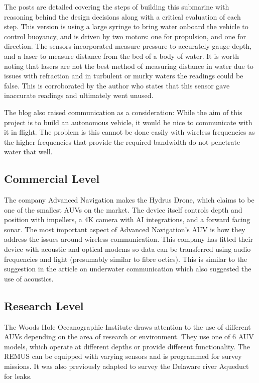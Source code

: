 \documentclass[11pt,a4paper,titlepage]{report}
\begin{document}
	The posts are detailed covering the steps of building this submarine with reasoning behind the design decisions along with a critical evaluation of each step. This version is using a large syringe to bring water onboard the vehicle to control buoyancy, and is driven by two motors: one for propulsion, and one for direction. The sensors incorporated measure pressure to accurately gauge depth, and a laser to measure distance from the bed of a body of water. It is worth noting that lasers are not the best method of measuring distance in water due to issues with refraction and in turbulent or murky waters the readings could be false. This is corroborated by the author who states that this sensor gave inaccurate readings and ultimately went unused. 
	
	The blog also raised communication as a consideration: While the aim of this project is to build an autonomous vehicle, it would be nice to communicate with it in flight. The problem is this cannot be done easily with wireless frequencies as the higher frequencies that provide the required bandwidth do not penetrate water that well.
	
	\subsection*{Commercial Level}
	The company Advanced Navigation makes the Hydrus Drone\cite{ADVANCED_NAVIGATION_HYDRUS}, which claims to be one of the smallest AUVs on the market. The device itself controls depth and position with impellers, a 4K camera with AI integrations, and a forward facing sonar. The most important aspect of Advanced Navigation's AUV is how they address the issues around wireless communication. This company has fitted their device with acoustic and optical modems so data can be transferred using audio frequencies and light (presumably similar to fibre octics). This is similar to the suggestion in the article on underwater communication\cite{UNDERWATER_RADIO} which also suggested the use of acoustics.
	
	\subsection*{Research Level}
	The Woods Hole Oceanographic Institute\cite{WOODS_HOLE} draws attention to the use of different AUVs depending on the area of research or environment. They use one of 6 AUV models, which operate at different depths or provide different functionality. The REMUS\cite{WOODS_HOLE_REMUS} can be equipped with varying sensors and is programmed for survey missions. It was also previously adapted to survey the Delaware river Aqueduct for leaks. 
	
\end{document}
